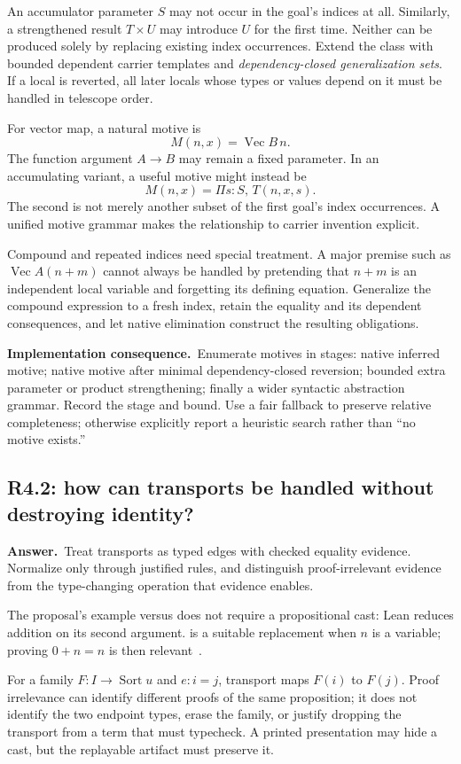 \documentclass[11pt,a4paper]{article}
\theoremstyle{definition}
\theoremstyle{remark}
\newcommand{\code}[1]{\texttt{\detokenize{#1}}}
\newcommand{\ans}{\noindent\textbf{Answer.}\ }
\newcommand{\imp}{\par\noindent\textbf{Implementation consequence.}\ }
\begin{document}
An accumulator parameter $S$ may not occur in the goal's indices at all.
Similarly, a strengthened result $T\times U$ may introduce $U$ for the first
time. Neither can be produced solely by replacing existing index occurrences.
Extend the class with bounded dependent carrier templates and
\emph{dependency-closed generalization sets}. If a local is reverted, all later
locals whose types or values depend on it must be handled in telescope order.

For vector map, a natural motive is
\[
 M(n,x)=\operatorname{Vec}B\,n.
\]
The function argument $A\to B$ may remain a fixed parameter. In an accumulating
variant, a useful motive might instead be
\[
 M(n,x)=\Pi s:S,\,T(n,x,s).
\]
The second is not merely another subset of the first goal's index occurrences.
A unified motive grammar makes the relationship to carrier invention explicit.

Compound and repeated indices need special treatment. A major premise such as
$\operatorname{Vec}A(n+m)$ cannot always be handled by pretending that $n+m$ is
an independent local variable and forgetting its defining equation. Generalize
the compound expression to a fresh index, retain the equality and its dependent
consequences, and let native elimination construct the resulting obligations.

\imp Enumerate motives in stages: native inferred motive; native motive after
minimal dependency-closed reversion; bounded extra parameter or product
strengthening; finally a wider syntactic abstraction grammar. Record the
stage and bound. Use a fair fallback to preserve relative completeness;
otherwise explicitly report a heuristic search rather than ``no motive
exists.''

\subsection{R4.2: how can transports be handled without destroying identity?}\label{q:R4.2}
\ans Treat transports as typed edges with checked equality evidence. Normalize
only through justified rules, and distinguish proof-irrelevant evidence from
the type-changing operation that evidence enables.

The proposal's example \code{Vec A (n + 0)} versus \code{Vec A n} does not
require a propositional cast: Lean reduces addition on its second argument.
\code{Vec A (0 + n)} is a suitable replacement when $n$ is a variable; proving
$0+n=n$ is then relevant~\cite{lean-recursion}.

For a family $F:I\to\operatorname{Sort}u$ and $e:i=j$, transport maps $F(i)$
to $F(j)$. Proof irrelevance can identify different proofs of the same
proposition; it does not identify the two endpoint types, erase the family,
or justify dropping the transport from a term that must typecheck. A printed
presentation may hide a cast, but the replayable artifact must preserve it.
\end{document}
